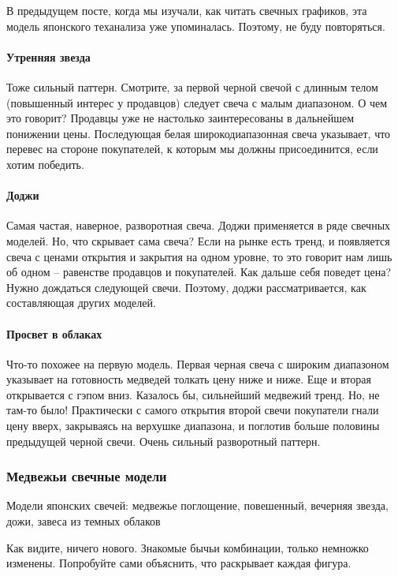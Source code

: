 \documentclass{book}
\begin{document}
В предыдущем посте, когда мы изучали, как читать свечных графиков, эта
модель японского теханализа уже упоминалась. Поэтому, не буду
повторяться.

\paragraph{Утренняя звезда}

Тоже сильный паттерн. Смотрите, за первой черной свечой с длинным
телом (повышенный интерес у продавцов) следует свеча с малым
диапазоном. О чем это говорит? Продавцы уже не настолько
заинтересованы в дальнейшем понижении цены. Последующая белая
широкодиапазонная свеча указывает, что перевес на стороне покупателей,
к которым мы должны присоединится, если хотим победить.

\paragraph{Доджи}

Самая частая, наверное, разворотная свеча. Доджи применяется в ряде
свечных моделей. Но, что скрывает сама свеча? Если на рынке есть
тренд, и появляется свеча с ценами открытия и закрытия на одном
уровне, то это говорит нам лишь об одном – равенстве продавцов и
покупателей. Как дальше себя поведет цена? Нужно дождаться следующей
свечи. Поэтому, доджи рассматривается, как составляющая других
моделей.

\paragraph{Просвет в облаках}

Что-то похожее на первую модель. Первая черная свеча с широким
диапазоном указывает на готовность медведей толкать цену ниже и
ниже. Еще и вторая открывается с гэпом вниз. Казалось бы, сильнейший
медвежий тренд. Но, не там-то было! Практически с самого открытия
второй свечи покупатели гнали цену вверх, закрываясь на верхушке
диапазона, и поглотив больше половины предыдущей черной свечи. Очень
сильный разворотный паттерн.

\subsubsection{Медвежьи свечные модели}

Модели японских свечей: медвежье поглощение, повешенный, вечерняя звезда, дожи, завеса из темных облаков

Как видите, ничего нового. Знакомые бычьи комбинации, только немножко изменены. Попробуйте сами объяснить, что раскрывает каждая фигура.
\end{document}
